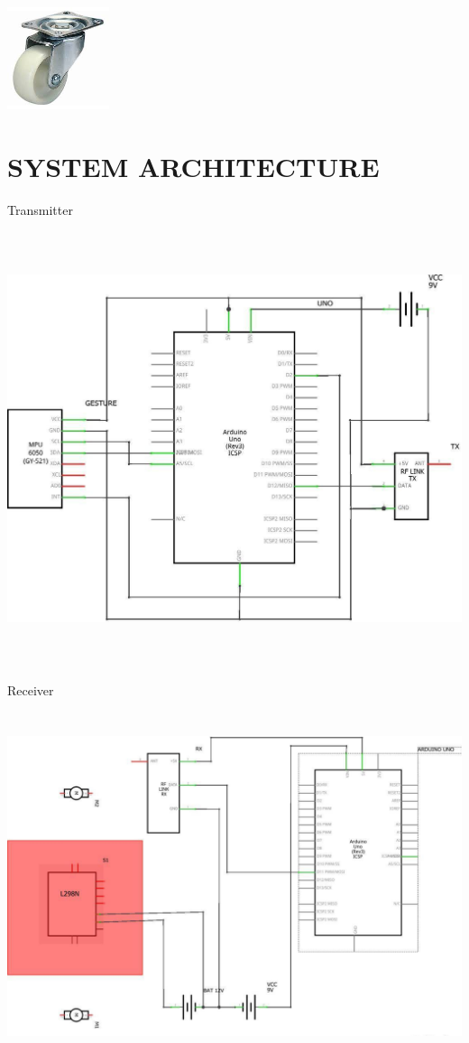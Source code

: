 \documentclass[12pt]{article}
\begin{document}
\includegraphics[height=3cm]{1CA.jpg}

\pagebreak
\section{SYSTEM ARCHITECTURE}
Transmitter

\includegraphics[height=5in]{ta.jpg}
\pagebreak

Receiver

\includegraphics[height=4in]{re.jpg}
\end{document}
